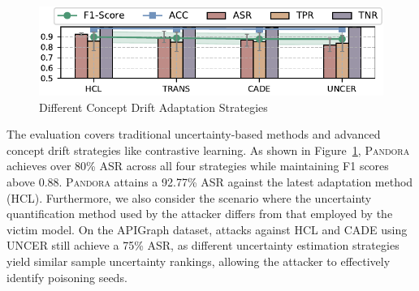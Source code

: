 \documentclass[lettersize,journal]{IEEEtran}
\newcommand{\pandora}{{\scshape Pandora}\xspace}
\begin{document}
\begin{figure}[h!]
	\centering
	\includegraphics[width=\linewidth,keepaspectratio]{Graph/Evaluation/Figure13.pdf}
	\caption{Different Concept Drift Adaptation Strategies}
	\label{fig:Attack-effectiveness-Concept-Drift-Strategy}
\end{figure}
The evaluation covers traditional uncertainty-based methods and advanced concept drift strategies like contrastive learning.
As shown in Figure~\ref{fig:Attack-effectiveness-Concept-Drift-Strategy}, \pandora achieves over 80\% ASR across all four strategies while maintaining F1 scores above 0.88.
\pandora attains a 92.77\% ASR against the latest adaptation method (HCL).
Furthermore, we also consider the scenario where the uncertainty quantification method used by the attacker differs from that employed by the victim model.
On the APIGraph dataset, attacks against HCL and CADE using UNCER still achieve a 75\% ASR, as different uncertainty estimation strategies yield similar sample uncertainty rankings, allowing the attacker to effectively identify poisoning seeds.
\end{document}
